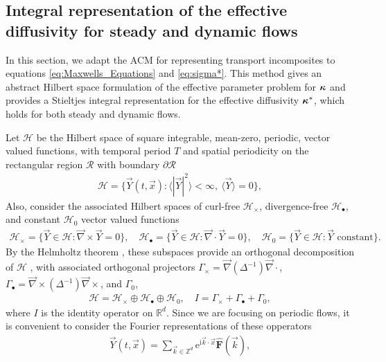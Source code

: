 \documentclass[11pt]{amsart}
\newcommand{\I}{\mathrm{i}}
\newcommand{\e}{\mathrm{e}}
\newcommand\bkappa{\mbox{\boldmath${\kappa}$}}
\begin{document}
\subsection{Integral representation of the effective diffusivity for
  steady and dynamic flows}\label{sec:Integral_Rep}
%
In this section, we adapt the ACM for representing transport
incomposites \cite{Golden:CMP-473} to equations
\eqref{eq:Maxwells_Equations} and \eqref{eq:sigma*}. This method gives
an abstract Hilbert space formulation of the effective parameter
problem for $\bkappa$ and provides a Stieltjes integral representation
for the effective diffusivity $\bkappa^*$, which holds for both steady
and dynamic flows.


Let $\mathscr{H}$ be the Hilbert space of square integrable,
mean-zero, periodic, vector valued functions, with temporal 
period $T$ and spatial periodicity on the rectangular region
$\mathcal{R}$ with boundary $\partial\mathcal{R}$  
%
\begin{align}
  \mathscr{H}=\{\vec{Y}(t,\vec{x}):\langle|\vec{Y}|^2\rangle<\infty, \ \langle\vec{Y}\rangle=0
  \},  
\end{align}
%
Also, consider the associated Hilbert spaces of curl-free
$\mathscr{H}_\times$, divergence-free $\mathscr{H}_\bullet$, and constant
$\mathscr{H}_0$ vector valued functions  
%
\begin{align}
  \mathscr{H}_\times=\{\vec{Y}\in\mathscr{H}:\vec{\nabla}\times\vec{Y}=0\}, \quad
  \mathscr{H}_\bullet=\{\vec{Y}\in\mathscr{H}:\vec{\nabla}\cdot\vec{Y}=0\}, \quad
  \mathscr{H}_0=\{\vec{Y}\in\mathscr{H}:\vec{Y} \text{ constant}\}.
\end{align}
%
By the Helmholtz theorem
\cite{Golden:CMP-473,Denaro:2003:0271,Bhatia:IEE:1077}, these 
subspaces provide an orthogonal decomposition of 
$\mathscr{H}$ \cite{Fannjiang:SIAM_JAM:333}, with
associated orthogonal projectors $\Gamma_\times=\vec{\nabla}(\Delta^{-1})\vec{\nabla}\cdot$,
$\Gamma_\bullet=\vec{\nabla}\times(\Delta^{-1})\vec{\nabla}\times$, and $\Gamma_0$,
\cite{Fannjiang:SIAM_JAM:333,Murphy:CMS:Submitted} 
%
\begin{align}
  \mathscr{H}=\mathscr{H}_\times\oplus\mathscr{H}_\bullet\oplus\mathscr{H}_0,\quad
  I=\Gamma_\times+\Gamma_\bullet+\Gamma_0,
\end{align}
%
where $I$ is the identity operator on $\mathbb{R}^d$.
Since we are focusing on periodic flows, it is convenient to consider
the Fourier representations of these opperators
%
\begin{align}
  \vec{Y}(t,\vec{x})=\sum_{\vec{k}\in\mathbb{Z}^d}\e^{\I\vec{k}\cdot\vec{x}}\hat{\mathbf{F}}(\vec{k}), 
\end{align}
%
\end{document}

